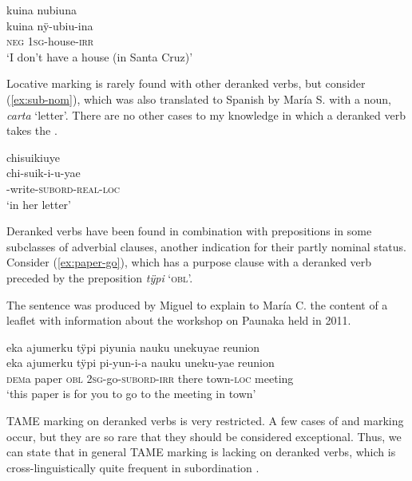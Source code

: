 \ea\label{ex:sub-irrnv}
\begingl
\glpreamble kuina nubiuna\\
\gla kuina nÿ-ubiu-ina\\
\glb \textsc{neg} 1\textsc{sg}-house-\textsc{irr}\\
\glft ‘I don’t have a house (in Santa Cruz)’
\endgl
\trailingcitation{[rxx-e120511l.233]}
\xe

Locative marking is rarely found with other deranked verbs, but consider (\ref{ex:sub-nom}), which was also translated to Spanish by María S. with a noun, \textit{carta} ‘letter’. There are no other cases to my knowledge in which a deranked verb takes the .

\ea\label{ex:sub-nom}
\begingl 
\glpreamble chisuikiuye\\
\gla chi-suik-i-u-yae\\ 
-write-\textsc{subord}-\textsc{real}-\textsc{loc}\\ 
\glft ‘in her letter’\\ 
\endgl
\trailingcitation{[rxx-e121128s-1.026]}
\xe


Deranked verbs have been found in combination with prepositions in some subclasses of adverbial clauses, another indication for their partly nominal status. Consider (\ref{ex:paper-go}), which has a purpose clause with a deranked verb preceded by the preposition \textit{tÿpi} ‘\textsc{obl}’.

The sentence was produced by Miguel to explain to María C. the content of a leaflet with information about the workshop on Paunaka held in 2011.

\ea\label{ex:paper-go}
\begingl
\glpreamble eka ajumerku tÿpi piyunia nauku unekuyae reunion\\
\gla eka ajumerku tÿpi pi-yun-i-a nauku uneku-yae reunion\\
\glb \textsc{dem}a paper \textsc{obl} 2\textsc{sg}-go-\textsc{subord}-\textsc{irr} there town-\textsc{loc} meeting\\
\glft ‘this paper is for you to go to the meeting in town’
\endgl
\trailingcitation{[mux-c110810l.012]}
\xe


TAME marking on deranked verbs is very restricted. A few cases of  and  marking occur, but they are so rare that they should be considered exceptional. Thus, we can state that in general TAME marking is lacking on deranked verbs, which is cross-linguistically quite frequent in subordination \citep[cf.][66]{Cristofaro2003}.  

